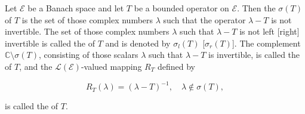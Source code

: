 Let $\mathcal{E}$ be a Banach space and let $T$ be a bounded operator on $\mathcal{E}$. Then the  $\sigma(T)$ of $T$ is the set of those complex numbers $\lambda$ such that the operator $\lambda - T$ is not invertible. The set of those complex numbers $\lambda$ such that $\lambda - T$ is not left [right] invertible is called the  of $T$ and is denoted by $\sigma_l(T)$ [$\sigma_r(T)$]. The complement $\mathbb{C} \setminus \sigma(T)$, consisting of those scalars $\lambda$ such that $\lambda - T$ is invertible, is called the  of $T$, and the $\mathcal{L}(\mathcal{E})$-valued mapping $R_T$ defined by

$$R_T(\lambda) = (\lambda - T)^{-1}, \quad \lambda \notin \sigma(T),$$

is called the  of $T$.

